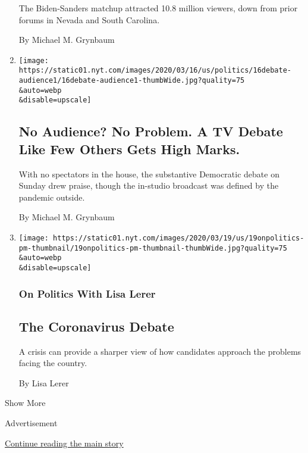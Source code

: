 \begin{enumerate}
  The Biden-Sanders matchup attracted 10.8 million viewers, down from
  prior forums in Nevada and South Carolina.

  By Michael M. Grynbaum
\item
  \href{/2020/03/16/us/elections/no-audience-cnn-democratic-debate.html}{}

  \texttt{[image: https://static01.nyt.com/images/2020/03/16/us/politics/16debate-audience1/16debate-audience1-thumbWide.jpg?quality=75\\\&auto=webp\\\&disable=upscale]}

  \hypertarget{no-audience-no-problem-a-tv-debate-like-few-others-gets-high-marks}{%
  \subsection{No Audience? No Problem. A TV Debate Like Few Others Gets
  High
  Marks.}\label{no-audience-no-problem-a-tv-debate-like-few-others-gets-high-marks}}

  With no spectators in the house, the substantive Democratic debate on
  Sunday drew praise, though the in-studio broadcast was defined by the
  pandemic outside.

  By Michael M. Grynbaum
\item
  \href{/2020/03/16/us/politics/debate-biden-sanders.html}{}

  \texttt{[image: https://static01.nyt.com/images/2020/03/19/us/19onpolitics-pm-thumbnail/19onpolitics-pm-thumbnail-thumbWide.jpg?quality=75\\\&auto=webp\\\&disable=upscale]}

  \hypertarget{on-politics-with-lisa-lerer}{%
  \subsubsection{On Politics With Lisa
  Lerer}\label{on-politics-with-lisa-lerer}}

  \hypertarget{the-coronavirus-debate}{%
  \subsection{The Coronavirus Debate}\label{the-coronavirus-debate}}

  A crisis can provide a sharper view of how candidates approach the
  problems facing the country.

  By Lisa Lerer
\end{enumerate}

Show More

Advertisement

\protect\hyperlink{after-mid2}{Continue reading the main story}

